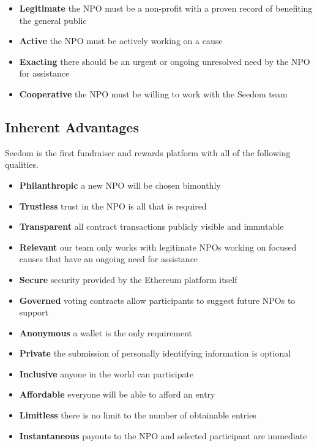 \documentclass[11pt]{article}
\begin{document}
\begin{itemize}
\item{\textbf{Legitimate} the NPO must be a non-profit with a proven record of benefiting the general public}
\item{\textbf{Active} the NPO must be actively working on a cause}
\item{\textbf{Exacting} there should be an urgent or ongoing unresolved need by the NPO for assistance}
\item{\textbf{Cooperative} the NPO must be willing to work with the Seedom team}
\end{itemize}

\subsection{Inherent Advantages}

Seedom is the first fundraiser and rewards platform with all of the following qualities.

\begin{itemize}
\item{\textbf{Philanthropic} a new NPO will be chosen bimonthly}
\item{\textbf{Trustless} trust in the NPO is all that is required}
\item{\textbf{Transparent} all contract transactions publicly visible and immutable}
\item{\textbf{Relevant} our team only works with legitimate NPOs working on focused causes that have an ongoing need for assistance}
\item{\textbf{Secure} security provided by the Ethereum platform itself}
\item{\textbf{Governed} voting contracts allow participants to suggest future NPOs to support}
\item{\textbf{Anonymous} a wallet is the only requirement}
\item{\textbf{Private} the submission of personally identifying information is optional}
\item{\textbf{Inclusive} anyone in the world can participate}
\item{\textbf{Affordable} everyone will be able to afford an entry}
\item{\textbf{Limitless} there is no limit to the number of obtainable entries}
\item{\textbf{Instantaneous} payouts to the NPO and selected participant are immediate}
\end{itemize}
\end{document}

